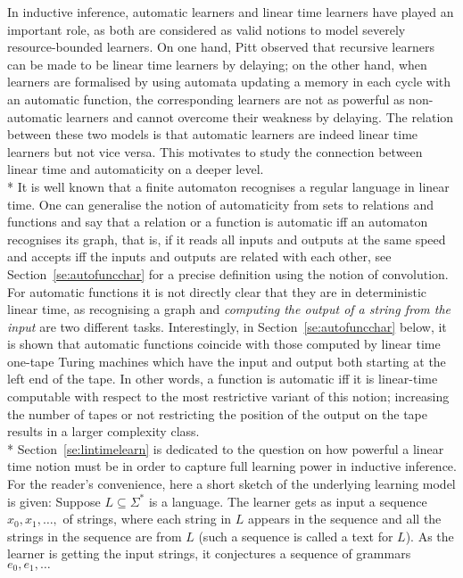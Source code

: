 \documentclass{LMCS}
\theoremstyle{plain}\newtheorem{athm}[thm]{Theorem}
\theoremstyle{plain}\newtheorem{aprop}[thm]{Proposition}
\theoremstyle{plain}\newtheorem{aprob}[thm]{Open Problem}
\theoremstyle{plain}\newtheorem{acor}[thm]{Corollary}
\theoremstyle{plain}\newtheorem{alem}[thm]{Lemma}
\theoremstyle{definition}\newtheorem{adefn}[thm]{Definition}
\theoremstyle{definition}\newtheorem{arem}[thm]{Remark}
\theoremstyle{plain}\newtheorem{aexmp}[thm]{Example}
\theoremstyle{plain}\newtheorem{aclm}[thm]{Claim}
\def\sp{\\*\indent}
\begin{document}
\noindent
In inductive inference, automatic learners and linear time learners have
played an important role, as both are considered as valid notions to model
severely resource-bounded learners.
On one hand, Pitt \cite{Pi89} observed that recursive learners can be made
to be linear time learners by delaying; on the other hand, when learners
are formalised by using automata updating a memory in each cycle with
an automatic function, the corresponding learners are not as powerful
as non-automatic learners \cite{JLS09} and cannot overcome their weakness
by delaying. The relation between these two models is that automatic learners
are indeed linear time learners \cite{CJLOSS11} but not vice versa.
This motivates to study the connection between linear time and automaticity
on a deeper level.
\sp
It is well known that a finite automaton recognises a regular language
in linear time. One can generalise the notion of automaticity from
sets to relations and functions \cite{Bl99,BG00,Ho76,Ho83,KN95,Ru08} 
and say that
a relation or a function is automatic iff an automaton recognises its graph,
that is, if it reads all inputs and outputs at the same speed and accepts
iff the inputs and outputs are related with each other, see
Section~\ref{se:autofuncchar} for a precise definition using the
notion of convolution. For automatic functions it is not directly
clear that they are in deterministic linear time, as recognising a graph
and {\em computing the output of a string from the input\/}
are two different tasks. Interestingly,
in Section~\ref{se:autofuncchar} below, it is shown that automatic functions
coincide with those computed by linear time one-tape Turing machines which
have the input and output both starting at the left end of the tape.
In other words, a function is automatic iff it is linear-time computable
with respect to the most restrictive variant of this notion;
increasing the number of tapes or not restricting the position of the
output on the tape results in a larger complexity class.
\sp
Section~\ref{se:lintimelearn} is dedicated to the question on how
powerful a linear time notion must be in order to capture full
learning power in inductive inference. For the reader's convenience,
here a short sketch of the underlying learning model is given:
Suppose $L \subseteq \Sigma^*$ is a language.
The learner gets as input a sequence $x_0, x_1, \ldots, $ of strings,
where each string in $L$ appears in the sequence and all the strings
in the sequence are from $L$ (such a sequence is called a text for $L$). 
As the learner is getting the input
strings, it conjectures a sequence of grammars $e_0,e_1,\ldots$
\end{document}
